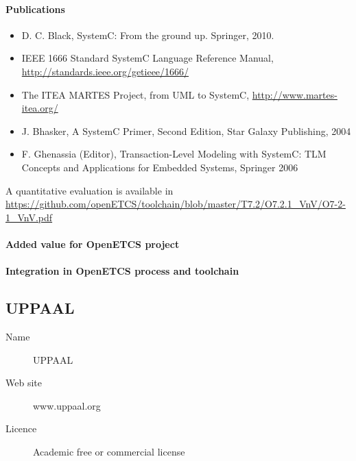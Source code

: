 \paragraph{Publications} 

\begin{itemize}
\item D. C. Black, SystemC: From the ground up. Springer, 2010.
\item IEEE 1666 Standard SystemC Language Reference Manual, \url{http://standards.ieee.org/getieee/1666/}
\item The ITEA MARTES Project, from UML to SystemC, \url{http://www.martes-itea.org/}
\item J. Bhasker, A SystemC Primer, Second Edition, Star Galaxy Publishing, 2004
\item F. Ghenassia (Editor), Transaction-Level Modeling with SystemC: TLM Concepts and
Applications for Embedded Systems, Springer 2006
\end{itemize}


A quantitative evaluation is available in \url{https://github.com/openETCS/toolchain/blob/master/T7.2/O7.2.1_VnV/O7-2-1_VnV.pdf}

\paragraph{Added value for OpenETCS project}

\begin{comment}
To complete: Stefan Rieger  ?
\end{comment}


\paragraph{Integration in OpenETCS process and toolchain}

\begin{comment}
To complete: Stefan Rieger  ?
\end{comment}


\subsection{UPPAAL}
\label{sec: UPPAALL}

\begin{description}
\item[Name] UPPAAL
\item[Web site] www.uppaal.org
\item[Licence] Academic free or commercial license
\end{description}

